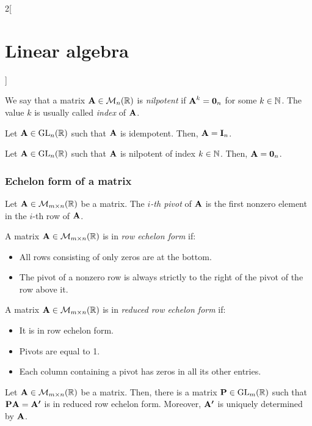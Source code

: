 \documentclass[../../../main_math.tex]{subfiles}
\begin{document}
\begin{multicols}{2}[\section{Linear algebra}]
  \begin{definition}
    We say that a matrix $\boldsymbol{\mathrm{A}}\in\mathcal{M}_n(\mathbb{R})$ is \emph{nilpotent} if $\boldsymbol{\mathrm{A}}^k=\boldsymbol{\mathrm{0}}_n$ for some $k\in\mathbb{N}$. The value $k$ is usually called \emph{index} of $\boldsymbol{\mathrm{A}}$.
  \end{definition}
  \begin{lemma}
    Let $\boldsymbol{\mathrm{A}}\in\mathrm{GL}_n(\mathbb{R})$ such that $\boldsymbol{\mathrm{A}}$ is idempotent. Then, $\boldsymbol{\mathrm{A}}=\boldsymbol{\mathrm{I}}_n$.
  \end{lemma}
  \begin{lemma}
    Let $\boldsymbol{\mathrm{A}}\in\mathrm{GL}_n(\mathbb{R})$ such that $\boldsymbol{\mathrm{A}}$ is nilpotent of index $k\in\mathbb{N}$. Then, $\boldsymbol{\mathrm{A}}=\boldsymbol{\mathrm{0}}_n$.
  \end{lemma}
  \subsubsection{Echelon form of a matrix}
  \begin{definition}
    Let $\boldsymbol{\mathrm{A}}\in\mathcal{M}_{m\times n}(\mathbb{R})$ be a matrix. The \emph{$i$-th pivot} of $\boldsymbol{\mathrm{A}}$ is the first nonzero element in the $i$-th row of $\boldsymbol{\mathrm{A}}$.
  \end{definition}
  \begin{definition}
    A matrix $\boldsymbol{\mathrm{A}}\in\mathcal{M}_{m\times n}(\mathbb{R})$ is in \emph{row echelon form} if:
    \begin{itemize}
      \item All rows consisting of only zeros are at the bottom.
      \item The pivot of a nonzero row is always strictly to the right of the pivot of the row above it.
    \end{itemize}
  \end{definition}
  \begin{definition}
    A matrix $\boldsymbol{\mathrm{A}}\in\mathcal{M}_{m\times n}(\mathbb{R})$ is in \emph{reduced row echelon form} if:
    \begin{itemize}
      \item It is in row echelon form.
      \item Pivots are equal to 1.
      \item Each column containing a pivot has zeros in all its other entries.
    \end{itemize}
  \end{definition}
  \begin{theorem}
    Let $\boldsymbol{\mathrm{A}}\in\mathcal{M}_{m\times n}(\mathbb{R})$ be a matrix. Then, there is a matrix $\boldsymbol{\mathrm{P}}\in\mathrm{GL}_m(\mathbb{R})$ such that $\boldsymbol{\mathrm{P}}\boldsymbol{\mathrm{A}}=\boldsymbol{\mathrm{A'}}$ is in reduced row echelon form. Moreover, $\boldsymbol{\mathrm{A'}}$ is uniquely determined by $\boldsymbol{\mathrm{A}}$.

\end{theorem}
\end{multicols}
\end{document}
